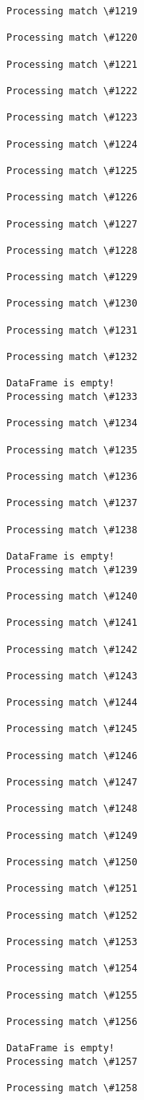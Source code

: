 \documentclass[11pt]{article}
\begin{document}
\begin{Verbatim}[commandchars=\\\{\}]
Processing match \#1219

Processing match \#1220

Processing match \#1221

Processing match \#1222

Processing match \#1223

Processing match \#1224

Processing match \#1225

Processing match \#1226

Processing match \#1227

Processing match \#1228

Processing match \#1229

Processing match \#1230

Processing match \#1231

Processing match \#1232

DataFrame is empty!
Processing match \#1233

Processing match \#1234

Processing match \#1235

Processing match \#1236

Processing match \#1237

Processing match \#1238

DataFrame is empty!
Processing match \#1239

Processing match \#1240

Processing match \#1241

Processing match \#1242

Processing match \#1243

Processing match \#1244

Processing match \#1245

Processing match \#1246

Processing match \#1247

Processing match \#1248

Processing match \#1249

Processing match \#1250

Processing match \#1251

Processing match \#1252

Processing match \#1253

Processing match \#1254

Processing match \#1255

Processing match \#1256

DataFrame is empty!
Processing match \#1257

Processing match \#1258


\end{Verbatim}
\end{document}
